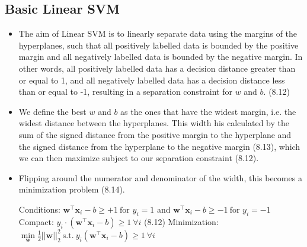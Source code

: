 \documentclass[english]{latex4ei/latex4ei_sheet}
\begin{document}
\begin{sectionbox}
\subsection{Basic Linear SVM}
\begin{itemize}
\item The aim of Linear SVM is to linearly separate data using the margins of the hyperplanes, such that all positively labelled data is bounded by the positive margin and all negatively labelled data is bounded by the negative margin. In other words, all positively labelled data has a decision distance greater than or equal to 1, and all negatively labelled data has a decision distance less than or equal to -1, resulting in a separation constraint for $w$ and $b$. (8.12)
\item We define the best $w$ and $b$ as the ones that have the widest margin, i.e. the widest distance between the hyperplanes. This width his calculated by the sum of the signed distance from the positive margin to the hyperplane and the signed distance from the hyperplane to the negative margin (8.13), which we can then maximize subject to our separation constraint (8.12). 
\item Flipping around the numerator and denominator of the width, this becomes a minimization problem (8.14).
\begin{emphbox}
    Conditions: $\mathbf{w^{\top}x}_i-b\ge +1 \ \mbox{for } y_i=
    1$ and $\mathbf{w^{\top}x}_i-b\ge -1 \ \mbox{for } y_i=
    -1$\\
    Compact: $y_i\cdot(\mathbf{w^{\top}x}_i-b)\ge1 \ \forall i$ (8.12)
    Minimization: $\min\limits_\mathbf{w}\frac{1}{2}||\mathbf{w}||^2_2 \ \mbox{s.t.} \ y_i(\mathbf{w^{\top}x}_i-b)\ge1 \ \forall i$
\end{emphbox}
\end{itemize}
\end{sectionbox}
\end{document}
